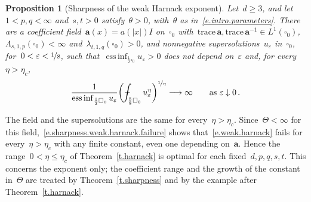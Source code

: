 \documentclass[11pt,letterpaper]{article}
\numberwithin{equation}{section}
\newtheorem{proposition}[theorem]{Proposition}
\theoremstyle{definition}
\renewcommand{\a}{\mathbf{a}}
\newcommand{\eps}{\varepsilon}
\newcommand{\nf}{\nicefrac}
\newcommand{\cu}{\square}
\newcommand*{\tr}{\mathrm{trace\,}}
\DeclareMathOperator*{\essinf}{ess\,inf}
\def\Xint#1{\mathchoice
	{\XXint\displaystyle\textstyle{#1}}%
	{\XXint\textstyle\scriptstyle{#1}}%
	{\XXint\scriptstyle\scriptscriptstyle{#1}}%
	{\XXint\scriptscriptstyle\scriptscriptstyle{#1}}%
	\!\int}
\def\XXint#1#2#3{{\setbox0=\hbox{$#1{#2#3}{\int}$}
		\vcenter{\hbox{$#2#3$}}\kern-.5\wd0}}
\def\fint{\Xint-}
\begin{document}
\begin{proposition}[Sharpness of the weak Harnack exponent]
\label{p.sharpness.weak.harnack}
Let~$d\geq3$, and let~$1<p,q<\infty$ and~$s,t>0$ satisfy~$\theta>0$, with~$\theta$ as in~\eqref{e.intro.parameters}. There are a coefficient field~$\a(x)=a(|x|)I$ on~$\cu_0$ with~$\tr\a,\tr\a^{-1}\in L^1(\cu_0)$,~$\Lambda_{s,1,p}(\cu_0)<\infty$ and~$\lambda_{t,1,q}(\cu_0)>0$, and nonnegative supersolutions~$u_\eps$ in~$\cu_0$, for~$0<\eps<\nf18$, such that~$\essinf_{\frac12\cu_0}u_\eps>0$ does not depend on~$\eps$ and, for every~$\eta>\eta_c$,
\begin{equation}
	\frac1{\essinf_{\frac12\cu_0}u_\eps}\biggl(\fint_{\frac58\cu_0}u_\eps^\eta\biggr)^{\nf1\eta}\longrightarrow\infty\qquad\mbox{as }\eps\downarrow0\,.
	\label{e.sharpness.weak.harnack.failure}
\end{equation}
\end{proposition}

\smallskip
The field and the supersolutions are the same for every~$\eta>\eta_c$. Since~$\Theta<\infty$ for this field,~\eqref{e.sharpness.weak.harnack.failure} shows that~\eqref{e.weak.harnack} fails for every~$\eta>\eta_c$ with any finite constant, even one depending on~$\a$. Hence the range~$0<\eta\leq\eta_c$ of Theorem~\ref{t.harnack} is optimal for each fixed~$d,p,q,s,t$. This concerns the exponent only; the coefficient range and the growth of the constant in~$\Theta$ are treated by Theorem~\ref{t.sharpness} and by the example after Theorem~\ref{t.harnack}.
\end{document}
